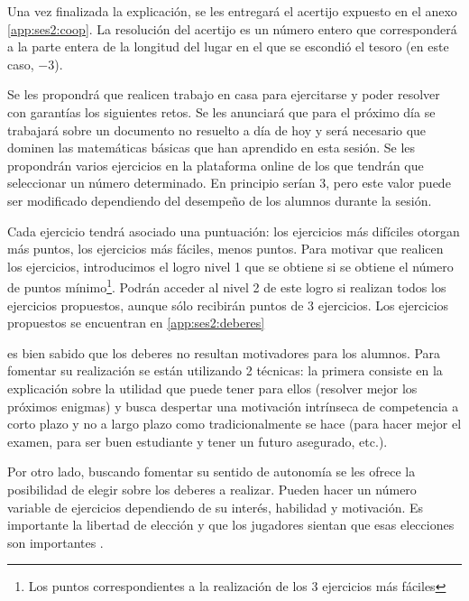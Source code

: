 Una vez finalizada la explicación, se les entregará el acertijo expuesto en el anexo \ref{app:ses2:coop}.
%
La resolución del acertijo es un número entero que corresponderá a la parte entera de la longitud del lugar en el que se escondió el tesoro (en este caso, $-3$).



Se les propondrá que realicen trabajo en casa para ejercitarse y poder resolver con garantías los siguientes retos.
%
Se les anunciará que para el próximo día se trabajará sobre un documento no resuelto a día de hoy y será necesario que dominen las matemáticas básicas que han aprendido en esta sesión.
%
Se les propondrán varios ejercicios en la plataforma online de los que tendrán que seleccionar un número determinado. 
%
En principio serían 3, pero este valor puede ser modificado dependiendo del desempeño de los alumnos durante la sesión.

Cada ejercicio tendrá asociado una puntuación: los ejercicios más difíciles otorgan más puntos, los ejercicios más fáciles, menos puntos.
%
%
Para motivar que realicen los ejercicios, introducimos el logro  nivel 1 que se obtiene si se obtiene el número de puntos mínimo\footnote{Los puntos correspondientes a la realización de los 3 ejercicios más fáciles}.
%
Podrán acceder al nivel 2 de este logro si realizan todos los ejercicios propuestos, aunque sólo recibirán puntos de 3 ejercicios.
%
Los ejercicios propuestos se encuentran en \ref{app:ses2:deberes}

	es bien sabido que los deberes no resultan motivadores para los alumnos. 
	Para fomentar su realización se están utilizando 2 técnicas: 
	la primera consiste en la explicación sobre la utilidad que puede tener para ellos (resolver mejor los próximos enigmas) y busca despertar una motivación intrínseca de competencia a corto plazo y no a largo plazo como tradicionalmente se hace (para hacer mejor el examen, para ser buen estudiante y tener un futuro asegurado, etc.).
	
	Por otro lado, buscando fomentar su sentido de autonomía se les ofrece la posibilidad de elegir sobre los deberes a realizar. 
	Pueden hacer un número variable de ejercicios dependiendo de su interés, habilidad y motivación.
	Es importante la libertad de elección y que los jugadores sientan que esas elecciones son importantes \citep{werbach2012win}.

